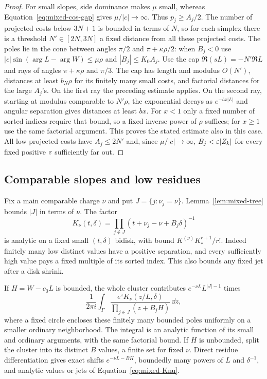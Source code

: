 \begin{proof}
For small slopes, side dominance makes $\mu$ small, whereas
Equation~\eqref{eq:mixed-cos-gap} gives $\mu/|c|\to\infty$.
Thus $p_j\geq A_j/2$. The number of projected costs below $3N+1$
is bounded in terms of $N$, so for each simplex there is a threshold
$N'\in[2N,3N]$ a fixed distance from all these projected costs.
The poles lie in the cone between angles $\pi/2$ and
$\pi+\kappa\rho/2$: when $B_j<0$ use
$|c|\sin(\arg L-\arg W)\leq\mu\rho$ and
$|B_j|\leq K_0A_j$. Use the cap
$\Re(sL)=-N'\Re L$ and rays of angles
$\pi+\kappa\rho$ and $\pi/3$. The cap has length and modulus
$O(N')$, distances at least $b_N\rho$ for its finitely many small
costs, and factorial distances for the large $A_j$'s. On the first
ray the preceding estimate applies. On the second ray, starting
at modulus comparable to $N'\rho$, the exponential decays as
$e^{-bx|L|}$ and angular separation gives distances at least $bx$.
For $x<1$ only a fixed number of sorted indices require that bound,
so a fixed inverse power of $\rho$ suffices; for $x\geq1$ use the
same factorial argument. This proves the stated estimate also in
this case. All low projected costs have $A_j\leq2N'$ and, since
$\mu/|c|\to\infty$, $B_j<\varepsilon |Z_k|$ for every fixed positive
$\varepsilon$ sufficiently far out.
\end{proof}

\subsection{Comparable slopes and low residues}

Fix a main comparable charge $\nu$ and put $J=\{j:\nu_j=\nu\}$.
Lemma~\ref{lem:mixed-tree} bounds $|J|$ in terms of $\nu$.
The factor
\begin{equation}\label{eq:mixed-Knu}
 K_\nu(t,\delta)=
 \prod_{j\notin J}(t+\nu_j-\nu+B_j\delta)^{-1}
\end{equation}
is analytic on a fixed small $(t,\delta)$ bidisk, with bound
$K^{(\nu)}K_*^{r+1}/r!$. Indeed finitely many low distinct values
have a positive separation, and every sufficiently high value
pays a fixed multiple of its sorted index. This also bounds any
fixed jet after a disk shrink.

If $H=W-c_0L$ is bounded, the whole cluster contributes
$e^{-\nu L}L^{|J|-1}$ times
\begin{equation}\label{eq:mixed-bounded-H}
 \frac{1}{2\pi i}\int_\Gamma
 \frac{e^zK_\nu(z/L,\delta)}
 {\prod_{j\in J}(z+B_jH)}\,\dd z,
\end{equation}
where a fixed circle encloses these finitely many bounded poles
uniformly on a smaller ordinary neighborhood. The integral is an
analytic function of its small and ordinary arguments, with the
same factorial bound. If $H$ is unbounded, split the cluster into
its distinct $B$ values, a finite set for fixed $\nu$. Direct
residue differentiation gives exact shifts $e^{-\nu L-BH}$,
boundedly many powers of $L$ and $\delta^{-1}$, and analytic
values or jets of Equation~\eqref{eq:mixed-Knu}.

